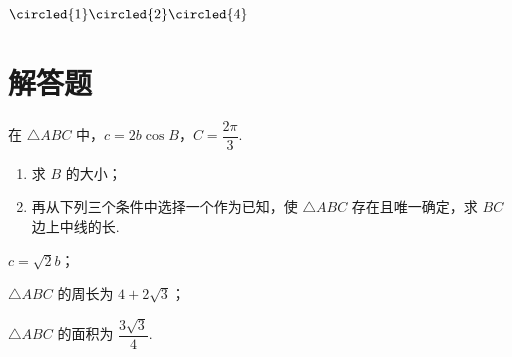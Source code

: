 \begin{answer}
\(\circled{1}\circled{2}\circled{4}\)
\end{answer}

\section{解答题}

\begin{problem}
在 \(\triangle ABC\) 中，\(c=2b\cos B\)，\(C=\dfrac{2\pi}{3}\).

\begin{enumerate}
    \item 求 \(B\) 的大小；
    \item 再从下列三个条件中选择一个作为已知，使 \(\triangle ABC\) 存在且唯一确定，求 \(BC\) 边上中线的长.
\end{enumerate}

\begin{circlelist}
\item \(c=\sqrt2b\)；

\item \(\triangle ABC\) 的周长为 \(4+2\sqrt3\)；

\item \(\triangle ABC\) 的面积为 \(\dfrac{3\sqrt3}{4}\).
\end{circlelist}
\end{problem}

